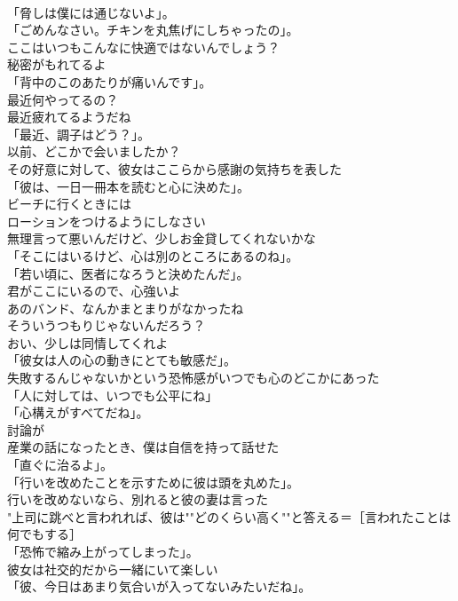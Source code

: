 \documentclass[8pt]{extreport}
\begin{document}
\begin{CJK}{UTF8}{min}
\\	「脅しは僕には通じないよ」。	
\\	「ごめんなさい。チキンを丸焦げにしちゃったの」。	
\\	ここはいつもこんなに快適ではないんでしょう？	
\\	秘密がもれてるよ	
\\	「背中のこのあたりが痛いんです」。	
\\	最近何やってるの？	
\\	最近疲れてるようだね	
\\	「最近、調子はどう？」。	
\\	以前、どこかで会いましたか？	
\\	その好意に対して、彼女はここらから感謝の気持ちを表した	
\\	「彼は、一日一冊本を読むと心に決めた」。	
\\	ビーチに行くときには
\\	ローションをつけるようにしなさい	
\\	無理言って悪いんだけど、少しお金貸してくれないかな	
\\	「そこにはいるけど、心は別のところにあるのね」。	
\\	「若い頃に、医者になろうと決めたんだ」。	
\\	君がここにいるので、心強いよ	
\\	あのバンド、なんかまとまりがなかったね	
\\	そういうつもりじゃないんだろう？	
\\	おい、少しは同情してくれよ	
\\	「彼女は人の心の動きにとても敏感だ」。	
\\	失敗するんじゃないかという恐怖感がいつでも心のどこかにあった	
\\	「人に対しては、いつでも公平にね」	
\\	「心構えがすべてだね」。	
\\	討論が
\\	産業の話になったとき、僕は自信を持って話せた	
\\	「直ぐに治るよ」。	
\\	「行いを改めたことを示すために彼は頭を丸めた」。	
\\	行いを改めないなら、別れると彼の妻は言った	
\\	"上司に跳べと言われれば、彼は""どのくらい高く""と答える＝［言われたことは何でもする］
\\	「恐怖で縮み上がってしまった」。	
\\	彼女は社交的だから一緒にいて楽しい	
\\	「彼、今日はあまり気合いが入ってないみたいだね」。	

\end{CJK}
\end{document}
